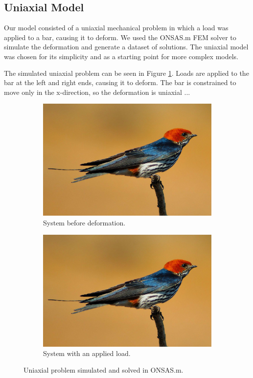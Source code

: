 \documentclass[11pt]{scrartcl} %
\begin{document}
\subsection{Uniaxial Model}
Our model consisted of a uniaxial mechanical problem in which a load was applied to a bar, causing it to deform. We used the ONSAS.m FEM solver to simulate the deformation and generate a dataset of solutions. The uniaxial model was chosen for its simplicity and as a starting point for more complex models.

The simulated uniaxial problem can be seen in Figure \ref{fig:uniaxial_model}. Loads are applied to the bar at the left and right ends, causing it to deform. The bar is constrained to move only in the x-direction, so the deformation is uniaxial ...

\begin{figure}[h]
	\centering
	\begin{subfigure}[b]{0.48\textwidth}
	\centering
	\includegraphics[width=\textwidth]{Figures/swallow.jpg}
	\caption{System before deformation.}
	\end{subfigure}
	\hfill
	\begin{subfigure}[b]{0.48\textwidth}
	\centering
	\includegraphics[width=\textwidth]{Figures/swallow.jpg}
	\caption{System with an applied load.}
	\end{subfigure}
	\caption{Uniaxial problem simulated and solved in ONSAS.m.}
	\label{fig:uniaxial_model}
	\end{figure}
\end{document}

